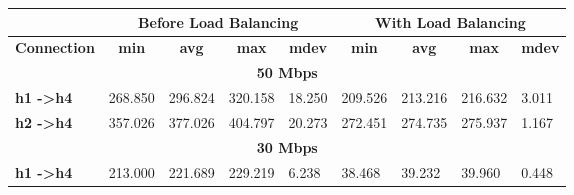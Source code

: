 \begin{table}[h!]
\centering
\begin{tabular}{l|l|l|l|l|l|l|l|l|}
\cline{2-9}
                                                   & \multicolumn{4}{c|}{\textbf{Before Load Balancing}}                                                                                            & \multicolumn{4}{c|}{\textbf{With Load Balancing}}                                                                                              \\ \hline
\multicolumn{1}{|c|}{\textbf{Connection}}          & \multicolumn{1}{c|}{\textbf{min}} & \multicolumn{1}{c|}{\textbf{avg}} & \multicolumn{1}{c|}{\textbf{max}} & \multicolumn{1}{c|}{\textbf{mdev}} & \multicolumn{1}{c|}{\textbf{min}} & \multicolumn{1}{c|}{\textbf{avg}} & \multicolumn{1}{c|}{\textbf{max}} & \multicolumn{1}{c|}{\textbf{mdev}} \\ \hline
\multicolumn{9}{|c|}{\textbf{50 Mbps}}                                                                                                                                                                                                                                                                                                               \\ \hline
\multicolumn{1}{|l|}{\textbf{h1 -\textgreater h4}} & 268.850                           & 296.824                           & 320.158                           & 18.250                             & 209.526                           & 213.216                           & 216.632                           & 3.011                              \\ \hline
\multicolumn{1}{|l|}{\textbf{h2 -\textgreater h4}} & 357.026                           & 377.026                           & 404.797                           & 20.273                             & 272.451                           & 274.735                           & 275.937                           & 1.167                              \\ \hline
\multicolumn{9}{|c|}{\textbf{30 Mbps}}                                                                                                                                                                                                                                                                                                               \\ \hline
\multicolumn{1}{|l|}{\textbf{h1 -\textgreater h4}} & 213.000                           & 221.689                           & 229.219                           & 6.238                              & 38.468                            & 39.232                            & 39.960                            & 0.448                              \\ \hline

\end{tabular}
\end{table}
